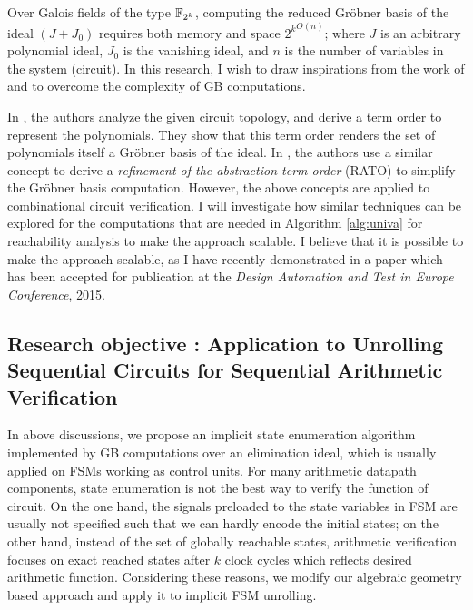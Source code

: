 Over Galois fields of the type ${\mathbb{F}}_{2^k}$, computing the reduced Gr\"obner
basis of the ideal $(J + J_0)$ requires both memory and space
${2^{k}}^{O(n)}$; where $J$ is an arbitrary polynomial ideal, $J_0$ is
the vanishing ideal, and $n$ is the number of variables in the system
(circuit). In this research, I wish to draw inspirations from the work
of \cite{jinpeng} and \cite{timDAC} to overcome the
complexity of GB computations. 


In \cite{jinpeng}, the authors analyze the given circuit topology,
and derive a term order to represent the polynomials. They show that
this term order renders the set of polynomials itself a Gr\"obner
basis of the ideal. In \cite{timDAC}, the authors use a similar
concept to derive a {\it refinement of the abstraction term order}
(RATO) to simplify the Gr\"obner basis computation. However, the above
concepts are applied to combinational circuit verification. I will
investigate how similar techniques can be explored for the
computations that are needed in Algorithm \ref{alg:univa} for
reachability analysis to make the approach scalable. I believe that it
is possible to make the approach scalable, as I have recently
demonstrated in a paper \cite{myDATE} %
which has been accepted for publication at the {\it Design Automation
  and Test in Europe Conference}, 2015. 



\subsection{Research objective : Application to Unrolling Sequential Circuits for Sequential Arithmetic Verification}
In above discussions, we propose an implicit state enumeration algorithm implemented by GB computations over
an elimination ideal, which is usually applied on FSMs working as control units. For many arithmetic
datapath components, state enumeration is not the best way to verify the function of circuit. On the one hand, the signals preloaded
to the state variables in FSM are usually not specified such that we can hardly encode the initial states; on the other
hand, instead of the set of globally reachable states, arithmetic verification focuses on exact reached states
after $k$ clock cycles which reflects desired arithmetic function. Considering these reasons, we modify
our algebraic geometry based approach and apply it to implicit FSM unrolling. 


